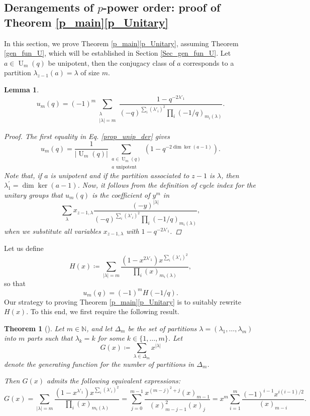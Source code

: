 \documentclass[a4paper, 12pt, oneside]{amsart}
\newtheorem{thm}[prop]{Theorem}
\newtheorem{lemma}[prop]{Lemma}
\theoremstyle{definition}
\DeclareMathOperator{\U}{U}
\begin{document}
\subsection{Derangements of $p$-power order: proof of Theorem \ref{p_main}\eqref{p_Unitary}}
In this section, we prove Theorem \ref{p_main}\eqref{p_Unitary}, assuming Theorem \ref{gen_fun_U}, which will be established in Section \ref{Sec_gen_fun_U}.
Let $a \in \U_m(q)$ be unipotent, then the conjugacy class of $a$  corresponds to a partition $\lambda_{z-1}(a)=\lambda$ of size $m$.
 \begin{lemma}
 \label{lemma_unip_U}
     $$u_m(q)=(-1)^m\sum_{\substack{\lambda \\ |\lambda|=m}}\frac{1-q^{-2\lambda'_1}}{(-q)^{\sum_{i}(\lambda'_i)^2}\prod_i(-1/q)_{m_i(\lambda)}}.$$
\begin{proof}
The first equality in Eq. \eqref{prop_unip_der} gives
$$u_m(q)=\frac{1}{|\U_m(q)|}\sum_{\substack{a \in \U_m(q)\\a \text{ unipotent}}}\left(1-q^{-2\dim \ker(a-1)}\right).$$
Note that, if $a$ is unipotent and if the partition associated to $z-1$ is $\lambda$, then $\lambda_1^{'}=\dim \ker(a-1)$. Now, it follows from the definition of cycle index for the unitary groups  that $u_m(q)$ is the coefficient of $y^m$ in 
  $$\sum_{\lambda}x_{z-1,\lambda}\frac{(-y)^{|\lambda|}}{(-q)^{\sum_{i}(\lambda'_i)^2}\prod_i(-1/q)_{m_i(\lambda)}},$$ when we substitute all variables $x_{z-1,\lambda}$ with $1-q^{-2\lambda'_1}$.
\end{proof}
 \end{lemma}
Let us define 
\begin{equation}
\label{H}
    H(x)\coloneqq\sum_{|\lambda|=m}\frac{(1-x^{2\lambda'_1})x^{\sum_i(\lambda'_i)^2}}{\prod_i(x)_{m_i(\lambda)}},
\end{equation}
so that 
\begin{equation}
\label{u_m(q)=(-1)^mH(-1/q)}
u_m(q)=(-1)^mH(-1/q).
 \end{equation}
Our strategy to proving Theorem \ref{p_main}\eqref{p_Unitary} is to suitably rewrite $H(x)$. To this end, we first require the following result.
 \begin{thm}[{\cite[Lemma 4.2 and Theorem 1.3]{SpigaAGL}}]
 \label{thmG}
Let $m \in \mathbb{N}$, and let $\Delta_m$ be the set of partitions $\lambda=(\lambda_1,\dots,\lambda_m)$ into $m$  parts such that $\lambda_k=k$ for some $k \in \{1,\dots,m\}$. Let $$G(x)\coloneqq\sum_{\lambda \in \Delta_m}x^{|\lambda|}$$ denote the generating function for the number of partitions in $\Delta_m$.

Then $G(x)$ admits the following equivalent expressions:
$$G(x)=\sum_{|\lambda|=m}\frac{(1-x^{\lambda'_1})x^{\sum_i(\lambda'_i)^2}}{\prod_i(x)_{m_i(\lambda)}}=\sum_{j=0}^{m-1}\frac{x^{(m-j)^2+j}(x)_{m-1}}{(x)^2_{m-j-1}(x)_j}=x^m\sum_{i=1}^{m}\frac{(-1)^{i-1}x^{i(i-1)/2}}{(x)_{m-i}}.$$
 \end{thm}
 
\end{document}
